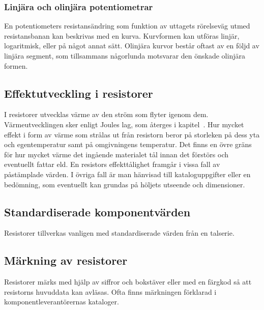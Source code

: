 \subsubsection{Linjära och olinjära potentiometrar}

En potentiometers resistansändring som funktion av uttagets rörelseväg utmed
resistansbanan kan beskrivas med en kurva.
Kurvformen kan utföras linjär, logaritmisk, eller på något annat sätt.
Olinjära kurvor består oftast av en följd av linjära segment, som tillsammans
någorlunda motsvarar den önskade olinjära formen.

\subsection{Effektutveckling i resistorer}

I resistorer utvecklas värme av den ström som flyter igenom dem.
Värmeutvecklingen sker enligt Joules lag, som återges i
kapitel~.
Hur mycket effekt i form av värme som strålas ut från resistorn beror på
storleken på dess yta och egentemperatur samt på omgivningens temperatur.
Det finns en övre gräns för hur mycket värme det ingående materialet tål innan
det förstörs och eventuellt fattar eld.
En resistors effekttålighet framgår i vissa fall av påstämplade värden.
I övriga fall är man hänvisad till kataloguppgifter eller en bedömning, som
eventuellt kan grundas på höljets utseende och dimensioner.

\subsection{Standardiserade komponentvärden}

Resistorer tillverkas vanligen med standardiserade värden från en talserie.

\subsection{Märkning av resistorer}
\label{subsec:faergmaerkning}

Resistorer märks med hjälp av siffror och bokstäver eller med en färgkod så att
resistorns huvuddata kan avläsas.
Ofta finns märkningen förklarad i komponentleverantörernas kataloger.

